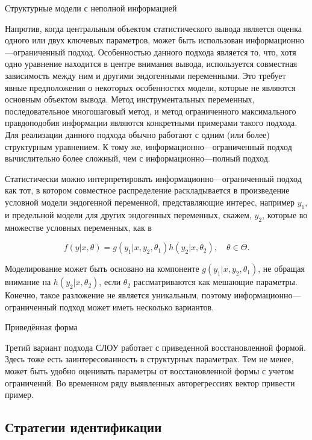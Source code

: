 	
\begin{center}
Структурные модели с неполной информацией
\end{center}


Напротив, когда центральным объектом статистического вывода является оценка одного или двух ключевых параметров, может быть использован информационно---ограниченный подход. Особенностью данного подхода является то, что, хотя одно уравнение находится в центре внимания вывода, используется совместная зависимость между ним и другими эндогенными переменными. Это требует явные предположения о некоторых особенностях модели, которые не являются основным объектом вывода. Метод инструментальных переменных, последовательное многошаговый метод, и метод ограниченного максимального правдоподобия информации являются конкретными примерами такого подхода. Для реализации данного подхода обычно работают с одним (или более) структурным уравнением. К тому же, информационно---ограниченный  подход вычислительно более сложный, чем с информационно---полный подход.


	Статистически можно интерпретировать информационно---ограниченный подход как тот, в котором совместное распределение раскладывается в произведение условной модели эндогенной переменной, представляющие интерес, например $y_{1}$, и предельной модели для других эндогенных переменных, скажем, $y_{2}$, которые во множестве условных переменных, как в

\begin{equation}
f(y|x,\theta)=g(y_{1}|x,y_{2},\theta_{1})h(y_{2}|x,\theta_{2}), \quad \theta \in \Theta.
\end{equation}


Моделирование может быть основано на компоненте $g(y_{1}|x,y_{2},\theta_{1})$, не обращая внимание на $h(y_{2}|x,\theta_{2})$, если $\theta_{2}$ рассматриваются как мешающие параметры. Конечно, такое разложение не является уникальным, поэтому информационно---ограниченный подход может иметь несколько вариантов.


\begin{center}
Приведённая форма
\end{center}


Третий вариант подхода СЛОУ работает с приведенной восстановленной формой. Здесь тоже есть заинтересованность в структурных параметрах. Тем не менее, может быть удобно оценивать параметры от восстановленной формы с учетом ограничений. Во временном ряду выявленных авторегрессиях вектор привести пример.


\subsection{Стратегии идентификации}



